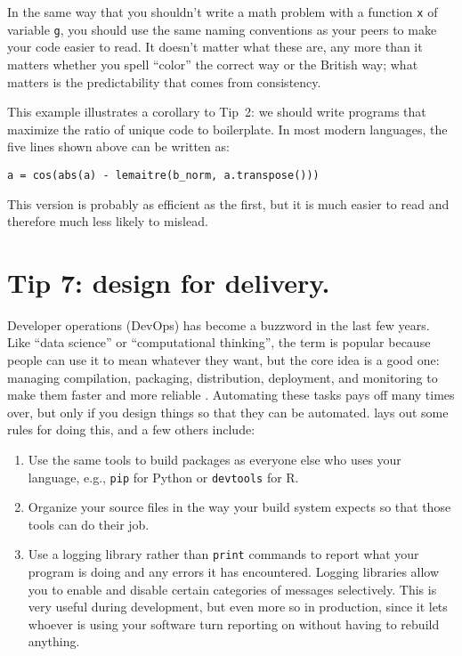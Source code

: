 \documentclass[10pt,letterpaper]{article}
\begin{document}
\begin{mdframed}
  In the same way that you shouldn't write a math problem with a function \texttt{x} of variable \texttt{g},
  you should use the same naming conventions as your peers
  to make your code easier to read.
  It doesn't matter what these are,
  any more than it matters whether you spell ``color'' the correct way or the British way;
  what matters is the predictability that comes from consistency.
\end{mdframed}

This example illustrates a corollary to Tip~2:
we should write programs that maximize the ratio of unique code to boilerplate.
In most modern languages,
the five lines shown above can be written as:

\begin{lstlisting}
a = cos(abs(a) - lemaitre(b_norm, a.transpose()))
\end{lstlisting}

\noindent
This version is probably as efficient as the first,
but it is much easier to read and therefore much less likely to mislead.

\section*{Tip 7: design for delivery.}

Developer operations (DevOps) has become a buzzword in the last few years.
Like ``data science'' or ``computational thinking'',
the term is popular because people can use it to mean whatever they want,
but the core idea is a good one:
managing compilation, packaging, distribution, deployment, and monitoring
to make them faster and more reliable \cite{Kim2016,Forsgren2018}.
Automating these tasks pays off many times over,
but only if you design things so that they can be automated.
\cite{Taschuk2017} lays out some rules for doing this,
and a few others include:

\begin{enumerate}

\item
  Use the same tools to build packages as everyone else who uses your language,
  e.g., \texttt{pip} for Python or \texttt{devtools} for R.

\item
  Organize your source files in the way your build system expects
  so that those tools can do their job.

\item
  Use a logging library rather than \texttt{print} commands
  to report what your program is doing and any errors it has encountered.
  Logging libraries allow you to enable and disable certain categories of messages selectively.
  This is very useful during development,
  but even more so in production,
  since it lets whoever is using your software turn reporting on
  without having to rebuild anything.

\end{enumerate}
\end{document}
